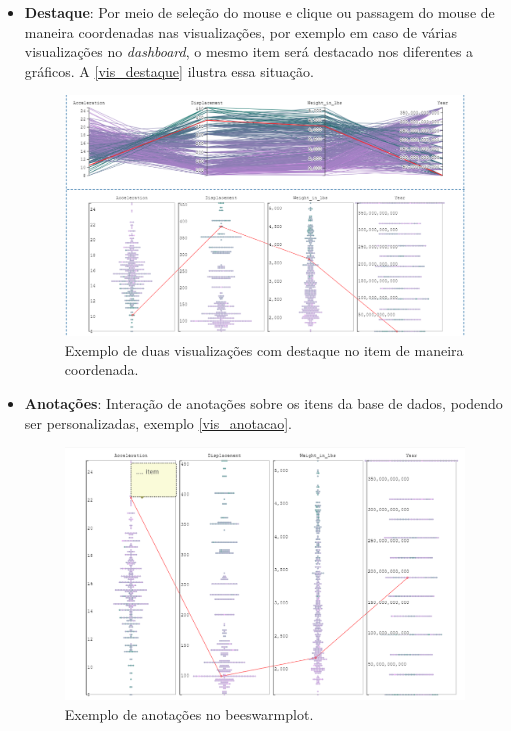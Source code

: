 \documentclass[
	12pt,				%
	openright,			%
	oneside,			%
	a4paper,			%
	english,			%
	brazil				%
	]{abntex2}
\begin{document}
\begin{itemize}
\item \textbf{Destaque}: Por meio de seleção do mouse e clique ou passagem do mouse de maneira coordenadas nas visualizações, por exemplo em caso de várias visualizações no \textit{dashboard}, o mesmo item será destacado nos diferentes a gráficos. A \autoref{vis_destaque} ilustra essa situação.
\begin{figure}
	\caption{\label{vis_destaque}  Exemplo de duas visualizações com destaque no item de maneira coordenada.
}
	\begin{center}
	    \includegraphics[width=35pc,scale=1]{figures/cordinate_highliht.png}
	\end{center}
\end{figure}

\item \textbf{Anotações}: Interação de anotações sobre os itens da base de dados, podendo ser personalizadas, exemplo \autoref{vis_anotacao}.

\begin{figure}
	\caption{\label{vis_anotacao}  Exemplo de anotações no beeswarmplot.
}
	\begin{center}
	    \includegraphics[width=35pc,scale=1]{figures/anottation.png}
	\end{center}
\end{figure}


\end{itemize}
\end{document}
